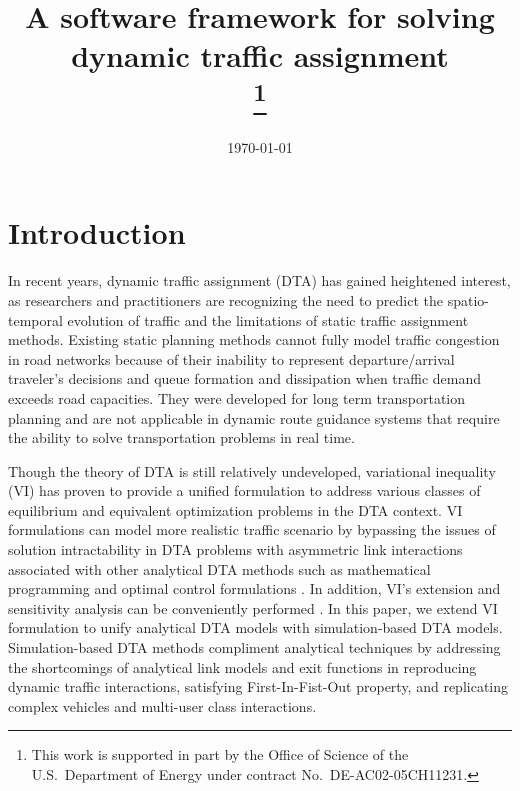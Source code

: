 \documentclass[conference]{IEEEtran}
\date{\today}
\renewcommand{\:}{\mathrel{\coloneqq}}
\renewcommand{\=}{\ensuremath{\eqqcolon}}
\newcommand{\0}{\ensuremath{\boldsymbol{0}}}
\begin{document}
\title{A software framework for solving dynamic traffic assignment\\
\thanks{This work is supported in part by the Office of Science of the
 U.S.~Department of Energy under contract No.~DE-AC02-05CH11231.}
}

\author{
}

\maketitle

\begin{abstract}
\end{abstract}

\begin{IEEEkeywords}
\end{IEEEkeywords}

\section{Introduction}
 In recent years, dynamic traffic assignment (DTA) has gained heightened interest, as researchers and practitioners are recognizing the need to predict the spatio-temporal evolution of traffic and the limitations of  static traffic assignment methods\cite{peeta2001foundations}. Existing static planning methods cannot fully model traffic congestion in road networks because of their inability to represent departure/arrival traveler's decisions and queue formation and dissipation when traffic demand exceeds road capacities\cite{nie2010solving}. They were developed for long term transportation planning and are not applicable in dynamic route guidance systems that require the ability to solve transportation problems in real time\cite{boyce1989route}.
 
Though the theory of DTA is still relatively undeveloped, variational inequality (VI) has proven to provide a unified formulation to address various classes of equilibrium and equivalent optimization problems in the DTA context. VI formulations can model more realistic traffic scenario by bypassing the issues of solution intractability in DTA problems with asymmetric link interactions associated with other analytical DTA methods such as mathematical programming and optimal control formulations . In addition, VI's extension and sensitivity analysis can be conveniently performed \cite{peeta2001foundations}. In this paper, we extend VI formulation to unify analytical DTA models with simulation-based DTA models. Simulation-based DTA methods compliment analytical techniques by addressing the shortcomings of analytical link models and exit functions in reproducing dynamic traffic interactions, satisfying First-In-Fist-Out property, and replicating complex vehicles and multi-user class interactions.
\end{document}
